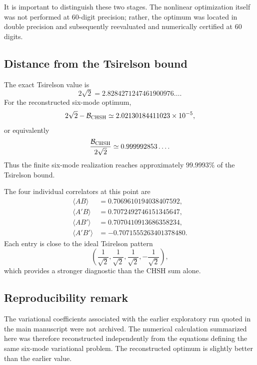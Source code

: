 \documentclass[11pt]{article}
\begin{document}
It is important to distinguish these two stages. The nonlinear optimization
itself was not performed at 60-digit precision; rather, the optimum was located
in double precision and subsequently reevaluated and numerically certified at
60 digits.

\subsection{Distance from the Tsirelson bound}

The exact Tsirelson value is
\begin{equation}
2\sqrt{2}
=
2.8284271247461900976\ldots .
\label{eq:app-tsirelson}
\end{equation}
For the reconstructed six-mode optimum,
\begin{equation}
2\sqrt{2}-\mathcal B_{\rm CHSH}
\simeq
2.02130184411023\times10^{-5},
\label{eq:app-distance}
\end{equation}
or equivalently
\begin{equation}
\frac{\mathcal B_{\rm CHSH}}{2\sqrt{2}}
\simeq
0.999992853\ldots .
\label{eq:app-ratio}
\end{equation}
Thus the finite six-mode realization reaches approximately $99.9993\%$ of the
Tsirelson bound.

The four individual correlators at this point are
\begin{align}
\langle AB\rangle
&=
0.7069610194038407592,
\\
\langle A'B\rangle
&=
0.7072492746151345647,
\\
\langle AB'\rangle
&=
0.7070410913686358234,
\\
\langle A'B'\rangle
&=
-0.7071555263401378480.
\label{eq:app-correlators}
\end{align}
Each entry is close to the ideal Tsirelson pattern
\begin{equation}
\left(
\frac{1}{\sqrt{2}},
\frac{1}{\sqrt{2}},
\frac{1}{\sqrt{2}},
-\frac{1}{\sqrt{2}}
\right),
\label{eq:app-pattern}
\end{equation}
which provides a stronger diagnostic than the CHSH sum alone.

\subsection{Reproducibility remark}

The variational coefficients associated with the earlier exploratory run quoted
in the main manuscript were not archived. The numerical calculation summarized
here was therefore reconstructed independently from the equations defining the
same six-mode variational problem. The reconstructed optimum is slightly better
than the earlier value.
\end{document}
